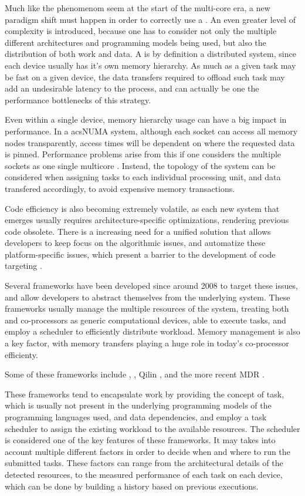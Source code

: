 \documentclass[main.tex]{subfiles}
\begin{document}
Much like the phenomenom seem at the start of the multi-core era, a new paradigm shift must happen in order to correctly use a \hetplat. An even greater level of complexity is introduced, because one has to consider not only the multiple different architectures and programming models being used, but also the distribution of both work and data. A \hetplat is by definition a distributed system, since each device usually has it's own memory hierarchy. As much as a given task may be fast on a given device, the data transfers required to offload such task may add an undesirable latency to the process, and can actually be one the performance bottlenecks of this strategy.

Even within a single device, memory hierarchy usage can have a big impact in performance. In a acs{NUMA} system, although each socket can access all memory nodes transparently, access times will be dependent on where the requested data is pinned. Performance problems arise from this if one considers the multiple sockets as one single multicore \cpu. Instead, the topology of the system can be considered when assigning tasks to each individual processing unit, and data transfered accordingly, to avoid expensive memory transactions.

Code efficiency is also becoming extremely volatile, as each new system that emerges usually requires architecture-specific optimizations, rendering previous code obsolete. There is a increasing need for a unified solution that allows developers to keep focus on the algorithmic issues, and automatize these platform-specific issues, which present a barrier to the development of code targeting \hetplats.

Several frameworks have been developed since around 2008 to target these issues, and allow developers to abstract themselves from the underlying system. These frameworks usually manage the multiple resources of the system, treating both \cpus and co-processors as generic computational devices, able to execute tasks, and employ a scheduler to efficiently distribute workload. Memory management is also a key factor, with memory transfers playing a huge role in today's co-processor efficienty.

Some of these frameworks include \gama {}, \starpu {}, Qilin , and the more recent MDR .

These frameworks tend to encapsulate work by providing the concept of task, which is usually not present in the underlying programming models of the programming languages used, and data dependencies, and employ a task scheduler to assign the existing workload to the available resources.
The scheduler is considered one of the key features of these frameworks. It may takes into account multiple different factors in order to decide when and where to run the submitted tasks. These factors can range from the architectural details of the detected resources, to the measured performance of each task on each device, which can be done by building a history based on previous executions.



\end{document}
